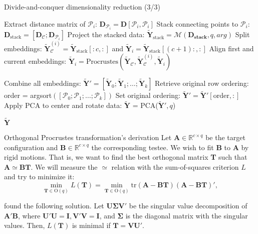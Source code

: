 \documentclass[10pt]{beamer}
\begin{document}
\begin{frame}{Divide-and-conquer dimensionality reduction (3/3)}
    \begin{algorithm}[H]
        \begin{algorithmic}[1]
        \setcounter{ALG@line}{9}
                \State Extract distance matrix of $\mathcal{P}_i$: $\mathbf{D}_{\mathcal{P}_i} = \mathbf{D}[\mathcal{P}_i,\mathcal{P}_i]$
                \State Stack connecting points to $\mathcal{P}_i$: $\mathbf{D}_{\text{stack}} = [\mathbf{D}_{\mathcal{C}}; \mathbf{D}_{\mathcal{P}_i}]$
                \State Project the stacked data: $\mathbf{\widetilde{Y}}_{\text{stack}} = \mathcal{M}(\mathbf{D_{\text{stack}}}, q, arg)$
                \State Split embeddings: $\mathbf{\widetilde{Y}}_{\mathcal{C}}^{(i)} = \mathbf{\widetilde{Y}}_{\text{stack}}[:c,:]$ and $\mathbf{\widetilde{Y}}_i = \mathbf{\widetilde{Y}}_{\text{stack}}[(c+1):,:]$
                \State Align first and current embeddings: $\mathbf{\widetilde{Y}}_i = \text{Procrustes}(\mathbf{\widetilde{Y}}_\mathcal{C}, \mathbf{\widetilde{Y}}_{\mathcal{C}}^{(i)}, \mathbf{\widetilde{Y}}_i)$
            \EndFor
            
            \State Combine all embeddings: $\mathbf{\widetilde{Y}}' = [\mathbf{\widetilde{Y}}_0; \mathbf{\widetilde{Y}}_1; \ldots; \mathbf{\widetilde{Y}}_k]$
            \State Retrieve original row ordering: order = argsort$([\mathcal{P}_0; \mathcal{P}_1; \ldots; \mathcal{P}_k])$
            \State Set original ordering: $\mathbf{\widetilde{Y}}' = \mathbf{\widetilde{Y}}'[\text{order},:]$
            \State Apply PCA to center and rotate data: $\mathbf{\widetilde{Y}}$ = PCA($\mathbf{\widetilde{Y}}', q$)
            
            \Return $\mathbf{\widetilde{Y}}$
        \end{algorithmic}
    \end{algorithm}
\end{frame}

\begin{frame}{Orthogonal Procrustes transformation's derivation}
    \justifying
    Let $\mathbf{A} \in \mathbb{R}^{c \times q}$ be the target configuration and $\mathbf{B} \in \mathbb{R}^{c \times q}$ the corresponding testee. We wish to fit \textbf{B} to \textbf{A} by \alert{rigid motions}. That is, we want to find the best \alert{orthogonal matrix} \textbf{T} such that $\mathbf{A} \simeq \mathbf{BT}$. We will measure the $\simeq$ relation with the sum-of-squares criterion $L$ and try to minimize it:
    $$
    \min_{\mathbf{T} \in \text{O}(q)} L(\mathbf{T}) = \min_{\mathbf{T} \in \text{O}(q)} \text{tr}(\mathbf{A}-\mathbf{BT})(\mathbf{A}-\mathbf{BT})',
    $$
    
    \citet{tenBerge1993} found the following solution. Let $\mathbf{U}\boldsymbol{\Sigma}\mathbf{V}'$ be the singular value decomposition of $\mathbf{A}' \mathbf{B}$, where $\mathbf{U}' \mathbf{U}=\mathbf{I}, \mathbf{V}' \mathbf{V}=\mathbf{I}$, and $\boldsymbol{\Sigma}$ is the diagonal matrix with the singular values. Then, $L(\mathbf{T})$ is minimal if $\mathbf{T} = \mathbf{V} \mathbf{U}'$.
\end{frame}
\end{document}
